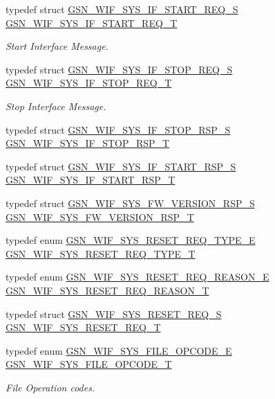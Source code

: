 \begin{DoxyCompactItemize}
\item 
typedef struct \hyperlink{a00353}{GSN\_\-WIF\_\-SYS\_\-IF\_\-START\_\-REQ\_\-S} \hyperlink{a00639_gae60d074a50101f9b50a01707e3d4f437}{GSN\_\-WIF\_\-SYS\_\-IF\_\-START\_\-REQ\_\-T}
\begin{DoxyCompactList}\small\item\em Start Interface Message. \end{DoxyCompactList}\item 
typedef struct \hyperlink{a00355}{GSN\_\-WIF\_\-SYS\_\-IF\_\-STOP\_\-REQ\_\-S} \hyperlink{a00639_ga1e2d9e30a2dac9894c1d8c54d6b2b68e}{GSN\_\-WIF\_\-SYS\_\-IF\_\-STOP\_\-REQ\_\-T}
\begin{DoxyCompactList}\small\item\em Stop Interface Message. \end{DoxyCompactList}\item 
typedef struct \hyperlink{a00356}{GSN\_\-WIF\_\-SYS\_\-IF\_\-STOP\_\-RSP\_\-S} \hyperlink{a00612_a471b870bb57e6c8f0723e15c1bdebc59}{GSN\_\-WIF\_\-SYS\_\-IF\_\-STOP\_\-RSP\_\-T}
\item 
typedef struct \hyperlink{a00354}{GSN\_\-WIF\_\-SYS\_\-IF\_\-START\_\-RSP\_\-S} \hyperlink{a00612_aa817647e9a90367153a9c5f5841dddee}{GSN\_\-WIF\_\-SYS\_\-IF\_\-START\_\-RSP\_\-T}
\item 
typedef struct \hyperlink{a00352}{GSN\_\-WIF\_\-SYS\_\-FW\_\-VERSION\_\-RSP\_\-S} \hyperlink{a00612_a7aabfad3317f43a3b7ed24a7cbd9a525}{GSN\_\-WIF\_\-SYS\_\-FW\_\-VERSION\_\-RSP\_\-T}
\item 
typedef enum \hyperlink{a00612_a6412fcc10baf67871043051f04fb42d4}{GSN\_\-WIF\_\-SYS\_\-RESET\_\-REQ\_\-TYPE\_\-E} \hyperlink{a00612_ac093cc24636c47d2eb47dbce3ae8be17}{GSN\_\-WIF\_\-SYS\_\-RESET\_\-REQ\_\-TYPE\_\-T}
\item 
typedef enum \hyperlink{a00612_aba0b2b7ee12a62ff72fa5ffa83622746}{GSN\_\-WIF\_\-SYS\_\-RESET\_\-REQ\_\-REASON\_\-E} \hyperlink{a00612_a9066276aeca288e6c17ee9c7f3351478}{GSN\_\-WIF\_\-SYS\_\-RESET\_\-REQ\_\-REASON\_\-T}
\item 
typedef struct \hyperlink{a00362}{GSN\_\-WIF\_\-SYS\_\-RESET\_\-REQ\_\-S} \hyperlink{a00612_a02f22acdace6e4ec546b18f2803d2935}{GSN\_\-WIF\_\-SYS\_\-RESET\_\-REQ\_\-T}
\item 
typedef enum \hyperlink{a00639_ga24ebbde6925db9b03e4648c99be320b4}{GSN\_\-WIF\_\-SYS\_\-FILE\_\-OPCODE\_\-E} \hyperlink{a00639_ga87b927b7d702c16024b46557013dbb64}{GSN\_\-WIF\_\-SYS\_\-FILE\_\-OPCODE\_\-T}
\begin{DoxyCompactList}\small\item\em File Operation codes. \end{DoxyCompactList}\item 

\end{DoxyCompactItemize}

